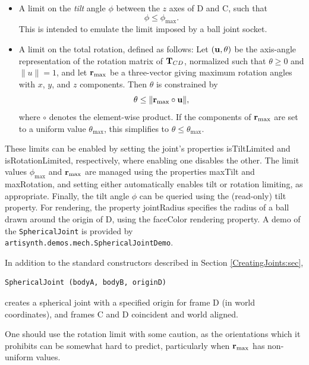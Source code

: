 \begin{itemize}

\item A limit on the {\it tilt} angle $\phi$ between
the $z$ axes of D and C, such that
%
\begin{equation}
\phi \le \phi_\text{max}.
\end{equation}
%
This is intended to emulate the limit imposed by a ball joint socket.

\item A limit on the total rotation, defined as follows: Let $({\bf u}, \theta)$
be the axis-angle representation of the rotation matrix of ${\bf T}_{CD}$,
normalized such that $\theta \ge 0$ and $\|u\| = 1$, and let
${\bf r}_\text{max}$ be a three-vector giving maximum rotation angles with
$x$, $y$, and $z$ components. Then $\theta$ is constrained by
%
\begin{equation}
\theta \le \| {\bf r}_\text{max} \circ {\bf u} \|,
\end{equation}
%
where $\circ$ denotes the element-wise product. If the components of
${\bf r}_\text{max}$ are set to a uniform value $\theta_\text{max}$, this
simplifies to $\theta \le \theta_\text{max}$.

\end{itemize}

These limits can be enabled by setting the joint's properties {\sf
isTiltLimited} and {\sf isRotationLimited}, respectively, where
enabling one disables the other. The limit values $\phi_\text{max}$
and ${\bf r}_\text{max}$ are managed using the properties {\sf maxTilt} and
{\sf maxRotation}, and setting either automatically enables tilt or
rotation limiting, as appropriate. Finally, the tilt angle $\phi$ can
be queried using the (read-only) {\sf tilt} property.  For rendering,
the property {\sf jointRadius} specifies the radius of a ball drawn
around the origin of D, using the {\sf faceColor} rendering
property. A demo of the {\tt SphericalJoint} is provided by {\tt
artisynth.demos.mech.SphericalJointDemo}.

In addition to the standard constructors described in
Section \ref{CreatingJoints:sec},
\begin{lstlisting}[]
  SphericalJoint (bodyA, bodyB, originD)
\end{lstlisting}
%
creates a spherical joint with a specified origin for frame D (in
world coordinates), and frames C and D coincident and world aligned.

\begin{sideblock}
One should use the rotation limit with some caution, as the
orientations which it prohibits can be somewhat hard to predict,
particularly when ${\bf r}_\text{max}$ has non-uniform values.
\end{sideblock}


